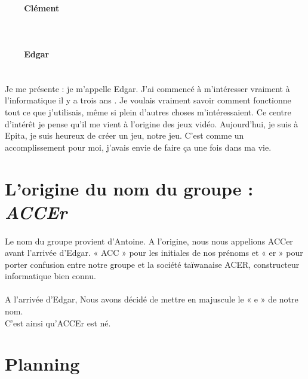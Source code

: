 \documentclass[titlepage, 13px, a4paper]{report}
\begin{document}
\paragraph{~~~~Clément} \hspace{0pt} \\


\paragraph{~~~~Edgar} \hspace{0pt} \\
Je me présente : je m’appelle Edgar. J’ai commencé à m’intéresser vraiment à l’informatique  il y a trois ans . Je voulais 
vraiment savoir comment fonctionne tout ce que j’utilisais, même si plein d’autres choses m’intéressaient. Ce centre d’intérêt 
je pense qu’il me vient à l’origine des jeux vidéo. Aujourd’hui, je suis à Epita, je suis heureux de créer un jeu, notre jeu. 
C’est comme un accomplissement pour moi, j’avais envie de faire ça une fois dans ma vie. \\


\section{L'origine du nom du groupe : \textit{ACCEr}}
\paragraph{} \hspace{0pt}
Le nom du groupe provient d’Antoine. A l’origine, nous nous appelions ACCer avant l’arrivée d’Edgar. 
« ACC » pour les initiales de nos prénoms et « er » pour porter confusion entre notre groupe 
et la société taïwanaise ACER, constructeur informatique bien connu. \\ \\
A l’arrivée d’Edgar, Nous avons décidé de mettre en majuscule le « e » de notre nom. \\
C’est ainsi qu’ACCEr est né.

\newpage

\section{Planning}
\end{document}
